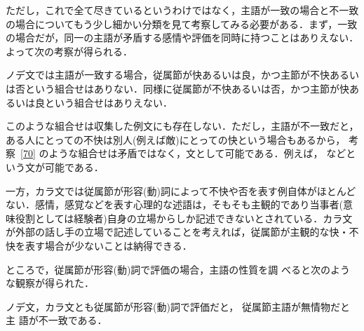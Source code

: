 ただし，これで全て尽きているというわけではなく，主語が一致の場合と不一致
の場合についてもう少し細かい分類を見て考察してみる必要がある．まず，一致
の場合だが，同一の主語が矛盾する感情や評価を同時に持つことはありえない．
よって次の考察が得られる．
\begin{kousatu}\label{70}
ノデ文では主語が一致する場合，従属節が快あるいは良，かつ主節が不快あるい
は否という組合せはありない．同様に従属節が不快あるいは否，かつ主節が快あ
るいは良という組合せはありえない．
\end{kousatu}
\vspace{-0.3mm}
このような組合せは収集した例文にも存在しない．ただし，主語が不一致だと，
ある人にとっての不快は別人(例えば敵)にとっての快という場合もあるから，
考察~\ref{70} のような組合せは矛盾ではなく，文として可能である．例えば，
などという文が可能である．

一方，カラ文では従属節が形容(動)詞によって不快や否を表す例自体がほとんど
ない．感情，感覚などを表す心理的な述語は，そもそも主観的であり当事者(意
味役割としては経験者)自身の立場からしか記述できないとされている．カラ文
が外部の話し手の立場で記述していることを考えれば，従属節が主観的な快・不
快を表す場合が少ないことは納得できる．

ところで，従属節が形容(動)詞で評価の場合，主語の性質を調
べると次のような観察が得られた．

\begin{obs}\label{90}
ノデ文，カラ文とも従属節が形容{\rm (}動{\rm )}詞で評価だと，
従属節主語が無情物だと主
語が不一致である．
\end{obs}

